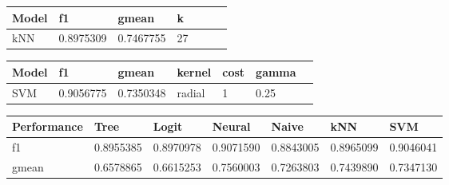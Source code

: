 \documentclass[11pt,a4paper]{article}
\begin{document}
\begin{enumerate}
\begin{table}[h!]
\centering
\begin{tabular}{|l|l|l|l|l|l|l|}
\hline
Model & f1        & gmean     & k  \\ \hline
kNN   & 0.8975309 & 0.7467755 & 27 \\ \hline
\end{tabular}
\end{table}

\begin{table}[h!]
\centering
\begin{tabular}{|l|l|l|l|l|l|l|}
\hline
Model & f1        & gmean     & kernel & cost & gamma \\ \hline
SVM   & 0.9056775 & 0.7350348 & radial & 1    & 0.25  \\ \hline
\end{tabular}
\end{table}

\begin{table}[h!]
\centering
\begin{tabular}{|l|l|l|l|l|l|l|}
\hline
Performance & Tree      & Logit     & Neural    & Naive     & kNN       & SVM       \\ \hline
f1            & 0.8955385 & 0.8970978 & 0.9071590 & 0.8843005 & 0.8965099 & 0.9046041 \\ \hline
gmean         & 0.6578865 & 0.6615253 & 0.7560003 & 0.7263803 & 0.7439890 & 0.7347130 \\ \hline
\end{tabular}
\end{table}

\end{enumerate}
\end{document}
